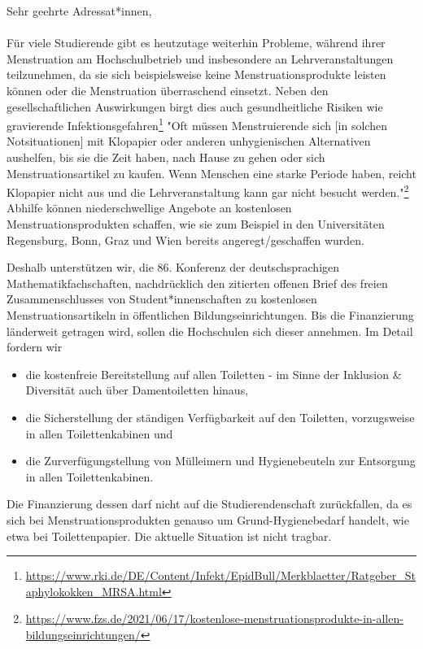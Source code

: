 \documentclass[DIV=calc]{scrartcl}
\begin{document}
Sehr geehrte Adressat*innen,\\
\\
Für viele Studierende gibt es heutzutage weiterhin Probleme, während ihrer Menstruation am Hochschulbetrieb und insbesondere an Lehrveranstaltungen teilzunehmen, da sie sich beispielsweise keine Menstruationsprodukte leisten können oder die Menstruation überraschend einsetzt. Neben den gesellschaftlichen Auswirkungen birgt dies auch gesundheitliche Risiken wie gravierende Infektionsgefahren\footnote{\url{https://www.rki.de/DE/Content/Infekt/EpidBull/Merkblaetter/Ratgeber_Staphylokokken_MRSA.html}} "Oft müssen Menstruierende sich [in solchen Notsituationen] mit Klopapier oder anderen unhygienischen Alternativen aushelfen, bis sie die Zeit haben, nach Hause zu gehen oder sich Menstruationsartikel zu kaufen. Wenn Menschen eine starke Periode haben, reicht Klopapier nicht aus und die Lehrveranstaltung kann gar nicht besucht werden."\footnote{\url{https://www.fzs.de/2021/06/17/kostenlose-menstruationsprodukte-in-allen-bildungseinrichtungen/}} Abhilfe können niederschwellige Angebote an kostenlosen Menstruationsprodukten schaffen, wie sie zum Beispiel in den Universitäten Regensburg, Bonn, Graz und Wien bereits angeregt/geschaffen wurden. 

Deshalb unterstützen wir, die 86. Konferenz der deutschsprachigen Mathematikfachschaften, nachdrücklich den zitierten offenen Brief des freien Zusammenschlusses von Student*innenschaften zu kostenlosen Menstruationsartikeln in öffentlichen Bildungseinrichtungen. Bis die Finanzierung länderweit getragen wird, sollen die Hochschulen sich dieser annehmen. Im Detail fordern wir
\begin{itemize}
    \item die kostenfreie Bereitstellung auf allen Toiletten - im Sinne der Inklusion \& Diversität auch über Damentoiletten hinaus,
    \item die Sicherstellung der ständigen Verfügbarkeit auf den Toiletten, vorzugsweise in allen Toilettenkabinen und
    \item die Zurverfügungstellung von Mülleimern und Hygienebeuteln zur Entsorgung in allen Toilettenkabinen.
    
\end{itemize}

Die Finanzierung dessen darf nicht auf die Studierendenschaft zurückfallen, da es sich bei Menstruationsprodukten genauso um Grund-Hygienebedarf handelt, wie etwa bei Toilettenpapier.
Die aktuelle Situation ist nicht tragbar.\\
\end{document}
